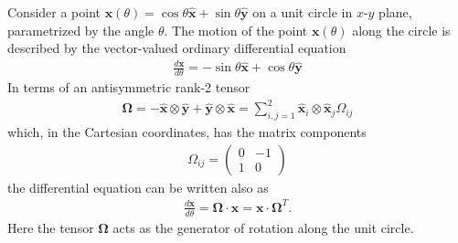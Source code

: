 \begin{example}
    Consider a point $\bm{x}(\theta)=\cos\theta\bm{\hat{x}}+\sin\theta\bm{\hat{y}}$ on a unit circle in $x$-$y$ plane, parametrized by the angle $\theta$. The motion of the point $\bm{x}(\theta)$ along the circle is described by the vector-valued ordinary differential equation
    \begin{align}
        \frac{d\bm{x}}{d\theta}=-\sin\theta\bm{\hat{x}}+\cos\theta\bm{\hat{y}}
    \end{align}
    In terms of an antisymmetric rank-2 tensor 
    \begin{align}
        \bm{\Omega}=-\bm{\hat{x}}\otimes\bm{\hat{y}}+\bm{\hat{y}}\otimes\bm{\hat{x}}=\sum_{i,j=1}^2\bm{\hat{x}}_i\otimes\bm{\hat{x}}_j\Omega_{ij}
    \end{align}
    which, in the Cartesian coordinates, has the matrix components
    \begin{align}
        \Omega_{ij}=\begin{pmatrix}
            0 & -1\\ 1 & 0
        \end{pmatrix}
    \end{align}
    the differential equation can be written also as
    \begin{align}
        \frac{d\bm{x}}{d\theta}=\bm{\Omega}\cdot\bm{x}=\bm{x}\cdot\bm{\Omega}^T.
    \end{align}
    Here the tensor $\bm{\Omega}$ acts as the generator of rotation along the unit circle.
\end{example}

